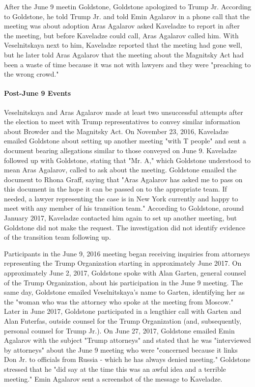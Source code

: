 After the June 9 meetin Goldstone, Goldstone apologized to Trump Jr.%
According to Goldstone, he told Trump Jr.
and told Emin Agalarov in a phone call that the meeting was about adoption
Aras Agalarov asked Kaveladze to report in after the meeting, but before Kaveladze could call, Aras Agalarov called him.%
With Veselnitskaya next to him, Kaveladze reported that the meeting had gone well, but he later told Aras Agalarov that the meeting about the Magnitsky Act had been a waste of time because it was not with lawyers and they were "preaching to the wrong crowd."%

\paragraph{Post-June 9 Events}

Veselnitskaya and Aras Agalarov made at least two unsuccessful attempts after the election to meet with Trump representatives to convey similar information about Browder and the Magnitsky Act.%
On November 23, 2016, Kaveladze emailed Goldstone about setting up another meeting "with T people" and sent a document bearing allegations similar to those conveyed on June 9.%
Kaveladze followed up with Goldstone, stating that "Mr. A," which Goldstone understood to mean Aras Agalarov, called to ask about the meeting.%
Goldstone emailed the document to Rhona Graff, saying that "Aras Agalarov has asked me to pass on this document in the hope it can be passed on to the appropriate team.
If needed, a lawyer representing the case is in New York currently and happy to meet with any member of his transition team."%
According to Goldstone, around January 2017, Kaveladze contacted him again to set up another meeting, but Goldstone did not make the request.%
The investigation did not identify evidence of the transition team following up.

Participants in the June 9, 2016 meeting began receiving inquiries from attorneys representing the Trump Organization starting in approximately June 2017.%
On approximately June 2, 2017, Goldstone spoke with Alan Garten, general counsel of the Trump Organization, about his participation in the June 9 meeting.%
The same day, Goldstone emailed Veselnitskaya's name to Garten, identifying her as the "woman who was the attorney who spoke at the meeting from Moscow."%
Later in June 2017, Goldstone participated in a lengthier call with Garten and Alan Futerfas, outside counsel for the Trump Organization (and, subsequently, personal counsel for Trump Jr.).%
On June 27, 2017, Goldstone emailed Emin Agalarov with the subject "Trump attorneys" and stated that he was "interviewed by attorneys" about the June 9 meeting who were "concerned because it links Don Jr. to officials from Russia - which he has always denied meeting."%
Goldstone stressed that he "did say at the time this was an awful idea and a terrible meeting."%
Emin Agalarov sent a screenshot of the message to Kaveladze.%

